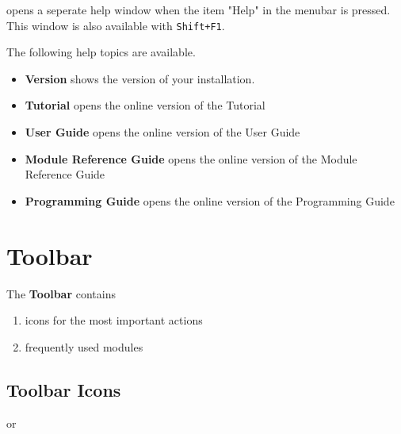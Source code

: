     {\covise} opens a seperate help window when the item "Help" in the menubar is pressed. 
    This window is also available with \verb:Shift+F1:.
     

	 The following help topics are available.

	 \begin{itemize}
	 \item {\bf Version} 
	 shows the version of your {\covise} installation. 
    
    \item {\bf Tutorial}
	 opens the online version of the Tutorial 

  	 \item {\bf User Guide} 
	 opens the online version of the User Guide

  	 \item {\bf Module Reference Guide} 
	 opens the online version of the Module Reference Guide
	 	 
	 \item {\bf Programming Guide} 
	 opens the online version of the Programming Guide 
	 
	 \end{itemize}





	 \section{Toolbar}
	 \label{toolbar}


	 The {\bf Toolbar} contains  
	 
	 \begin{enumerate}
	 \item icons for the most important actions
	 \item frequently used modules 
	 \end{enumerate}
	 
    
    
    
    
	 
	 \subsection{Toolbar Icons}

	  or   
	 
